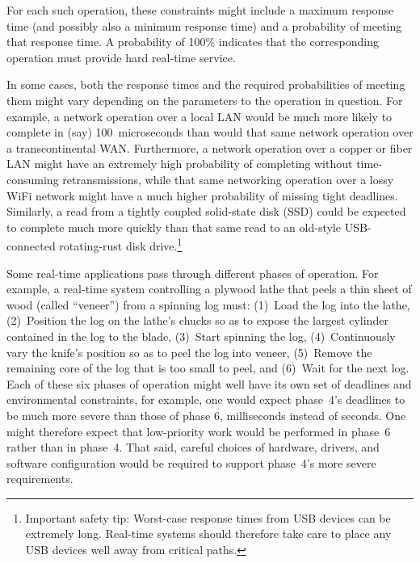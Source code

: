 For each such operation, these constraints might include a maximum
response time (and possibly also a minimum response time) and a
probability of meeting that response time.
A probability of 100\% indicates that the corresponding operation
must provide hard real-time service.

In some cases, both the response times and the required probabilities of
meeting them might vary depending on the parameters to the operation in
question.
For example, a network operation over a local LAN would be much more likely
to complete in (say) 100~microseconds than would that same network operation
over a transcontinental WAN.
Furthermore, a network operation over a copper or fiber
LAN might have an extremely
high probability of completing without time-consuming retransmissions,
while that same networking operation over a lossy WiFi network might
have a much higher probability of missing tight deadlines.
Similarly, a read from a tightly coupled solid-state disk (SSD) could be
expected to complete much more quickly than that same read to an old-style
USB-connected rotating-rust disk drive.\footnote{
	Important safety tip:  Worst-case response times from USB devices
	can be extremely long.
	Real-time systems should therefore take care to place any USB
	devices well away from critical paths.}

Some real-time applications pass through different phases of operation.
For example, a real-time system controlling a plywood lathe that peels
a thin sheet of wood (called ``veneer'') from a spinning log must:
(1)~Load the log into the lathe,
(2)~Position the log on the lathe's chucks so as to expose the largest
cylinder contained in the log to the blade,
(3)~Start spinning the log,
(4)~Continuously vary the knife's position so as to peel the log into veneer,
(5)~Remove the remaining core of the log that is too small to peel, and
(6)~Wait for the next log.
Each of these six phases of operation might well have its own set of
deadlines and environmental constraints,
for example, one would expect phase~4's deadlines to be much more severe
than those of phase 6, milliseconds instead of seconds.
One might therefore expect that low-priority work would be performed in
phase~6 rather than in phase~4.
That said, careful choices of hardware, drivers, and software configuration
would be required to support phase~4's more severe requirements.

